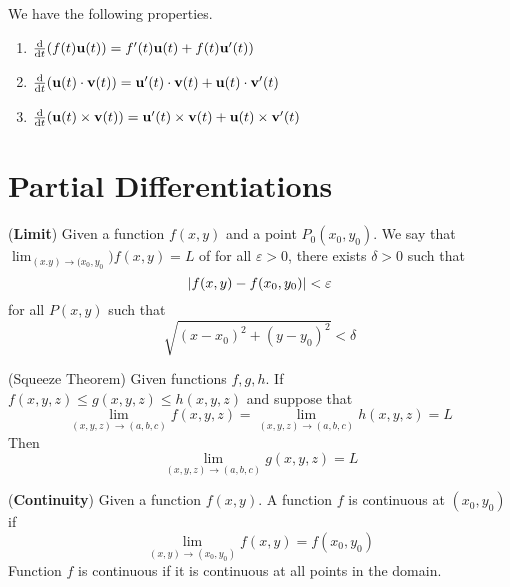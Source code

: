 \documentclass{huhtakm-template-book}
\begin{document}
\begin{lem}
    We have the following properties.
    \begin{enumerate}
        \item $\odv{}{t}(f(t)\mathbf{u}(t))=f'(t)\mathbf{u}(t)+f(t)\mathbf{u}'(t))$
        \item $\odv{}{t}(\mathbf{u}(t)\cdot\mathbf{v}(t))=\mathbf{u}'(t)\cdot\mathbf{v}(t)+\mathbf{u}(t)\cdot\mathbf{v}'(t)$
        \item $\odv{}{t}(\mathbf{u}(t)\times\mathbf{v}(t))=\mathbf{u}'(t)\times\mathbf{v}(t)+\mathbf{u}(t)\times\mathbf{v}'(t)$
    \end{enumerate}
\end{lem}

\chapter{Partial Differentiations}
\begin{defn}(\textbf{Limit})
    Given a function $f(x,y)$ and a point $P_{0}(x_{0},y_{0})$. We say that $\lim_{(x.y)\to(x_{0},y_{0}})f(x,y)=L$ of for all $\varepsilon>0$, there exists $\delta>0$ such that
    \begin{equation*}
        \left|{f(x,y)-f(x_{0},y_{0})}\right|<\varepsilon
    \end{equation*}
    for all $P(x,y)$ such that
    \begin{equation*}
        \sqrt{(x-x_{0})^{2}+(y-y_{0})^{2}}<\delta
    \end{equation*}
\end{defn}
\begin{thm}(Squeeze Theorem)
    Given functions $f,g,h$. If $f(x,y,z)\leq g(x,y,z)\leq h(x,y,z)$ and suppose that
    \begin{equation*}
        \lim_{(x,y,z)\to(a,b,c)}f(x,y,z)=\lim_{(x,y,z)\to(a,b,c)}h(x,y,z)=L
    \end{equation*}
    Then
    \begin{equation*}
        \lim_{(x,y,z)\to(a,b,c)}g(x,y,z)=L
    \end{equation*}
\end{thm}
\begin{defn}(\textbf{Continuity})
    Given a function $f(x,y)$. A function $f$ is continuous at $(x_{0},y_{0})$ if
    \begin{equation*}
        \lim_{(x,y)\to(x_{0},y_{0})}f(x,y)=f(x_{0},y_{0})
    \end{equation*}
    Function $f$ is continuous if it is continuous at all points in the domain. 
\end{defn}
\end{document}
